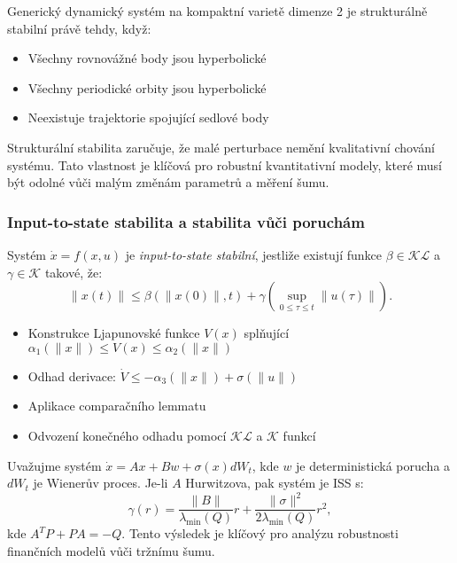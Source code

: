 \begin{theorem}
Generický dynamický systém na kompaktní varietě dimenze 2 je strukturálně stabilní právě tehdy, když:
\begin{itemize}
\item Všechny rovnovážné body jsou hyperbolické
\item Všechny periodické orbity jsou hyperbolické
\item Neexistuje trajektorie spojující sedlové body
\end{itemize}
\end{theorem}

\begin{keyinsight}
Strukturální stabilita zaručuje, že malé perturbace nemění kvalitativní chování systému. Tato vlastnost je klíčová pro robustní kvantitativní modely, které musí být odolné vůči malým změnám parametrů a měření šumu.
\end{keyinsight}

\subsubsection{Input-to-state stabilita a stabilita vůči poruchám}

\begin{definition}
Systém $\dot{x} = f(x,u)$ je \emph{input-to-state stabilní}, jestliže existují funkce $\beta \in \mathcal{KL}$ a $\gamma \in \mathcal{K}$ takové, že:
\[
\|x(t)\| \leq \beta(\|x(0)\|, t) + \gamma\left(\sup_{0\leq \tau \leq t} \|u(\tau)\|\right).
\]
\end{definition}

\begin{proofsketch}
\begin{itemize}
\item Konstrukce Ljapunovské funkce $V(x)$ splňující $\alpha_1(\|x\|) \leq V(x) \leq \alpha_2(\|x\|)$
\item Odhad derivace: $\dot{V} \leq -\alpha_3(\|x\|) + \sigma(\|u\|)$
\item Aplikace comparačního lemmatu
\item Odvození konečného odhadu pomocí $\mathcal{KL}$ a $\mathcal{K}$ funkcí
\end{itemize}
\end{proofsketch}

\begin{application}
Uvažujme systém $\dot{x} = Ax + Bw + \sigma(x)dW_t$, kde $w$ je deterministická porucha a $dW_t$ je Wienerův proces. Je-li $A$ Hurwitzova, pak systém je ISS s:
\[
\gamma(r) = \frac{\|B\|}{\lambda_{\min}(Q)}r + \frac{\|\sigma\|^2}{2\lambda_{\min}(Q)}r^2,
\]
kde $A^T P + PA = -Q$. Tento výsledek je klíčový pro analýzu robustnosti finančních modelů vůči tržnímu šumu.
\end{application}


